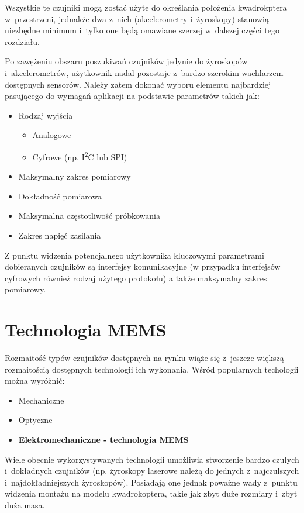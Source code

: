 \documentclass[11pt, twoside]{Thesis} %
\begin{document}
Wszystkie te czujniki mogą zostać użyte do określania położenia kwadrokptera w~przestrzeni, jednakże dwa z~nich (akcelerometry i~żyroskopy) stanowią niezbędne minimum i~tylko one będą omawiane szerzej w~dalszej części tego rozdziału.

Po zawężeniu obszaru poszukiwań czujników jedynie do żyroskopów i~akcelerometrów, użytkownik nadal pozostaje z~bardzo szerokim wachlarzem dostępnych sensorów. Należy zatem dokonać wyboru elementu najbardziej pasującego do wymagań aplikacji na podstawie parametrów takich jak:

\begin{itemize}
	\item Rodzaj wyjścia
		\begin{itemize}
			\item Analogowe
			\item Cyfrowe (np. I\textsuperscript{2}C lub SPI)
		\end{itemize}
	\item Maksymalny zakres pomiarowy
	\item Dokładność pomiarowa
	\item Maksymalna częstotliwość próbkowania
	\item Zakres napięć zasilania
\end{itemize}

Z punktu widzenia potencjalnego użytkownika kluczowymi parametrami dobieranych czujników są interfejsy komunikacyjne (w przypadku interfejsów cyfrowych również rodzaj użytego protokołu) a także maksymalny zakres pomiarowy.

\section{Technologia MEMS}

Rozmaitość typów czujników dostępnych na rynku wiąże się z~jeszcze większą rozmaitością dostępnych technologii ich wykonania. Wśród popularnych techologii można wyróżnić:

\begin{itemize}
	\item Mechaniczne
	\item Optyczne
	\item \textbf{Elektromechaniczne - technologia MEMS}
\end{itemize}

Wiele obecnie wykorzystywanych technologii umożliwia stworzenie bardzo czułych i~dokładnych czujników (np. żyroskopy laserowe należą do jednych z~najczulszych i~najdokładniejszych żyroskopów). Posiadają one jednak poważne wady z~punktu widzenia montażu na modelu kwadrokoptera, takie jak zbyt duże rozmiary i~zbyt duża masa. 
\end{document}
